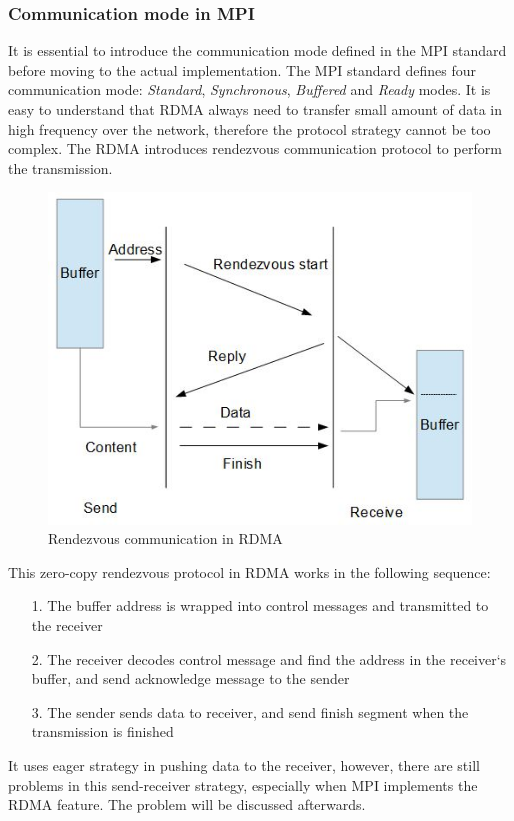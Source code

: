 \documentclass[11pt,openright,a4paper]{report}
\begin{document}
\subsubsection{Communication mode in MPI}
It is essential to introduce the communication mode defined in the MPI standard before moving to the actual implementation. The MPI standard defines four communication mode: \textit{Standard}, \textit{Synchronous}, \textit{Buffered} and \textit{Ready} modes\cite{dimitrov1999efficient}. It is easy to understand that RDMA always need to transfer small amount of data in high frequency over the network, therefore the protocol strategy cannot be too complex. The RDMA introduces rendezvous communication protocol to perform the transmission.\\
\begin{figure}[H]
\centering
\includegraphics[width=0.6\linewidth]{picture/rendezvousMode}
\caption{Rendezvous communication in RDMA}
\label{fig:rendezvousMode}
\end{figure}
This zero-copy rendezvous protocol in RDMA works in the following sequence:
\begin{itemize}
	\item[1.] The buffer address is wrapped into control messages and transmitted to the receiver
	\item[2.] The receiver decodes control message and find the address in the receiver`s buffer, and send acknowledge message to the sender
	\item[3.] The sender sends data to receiver, and send finish segment when the transmission is finished
\end{itemize}
It uses eager strategy in pushing data to the receiver, however, there are still problems in this send-receiver strategy, especially when MPI implements the RDMA feature. The problem will be discussed afterwards.
\end{document}
